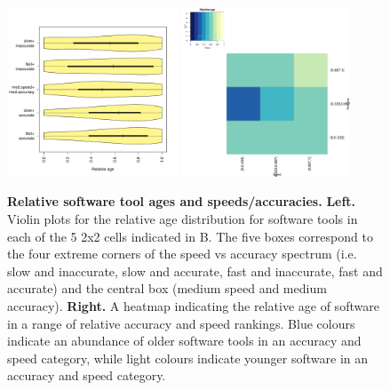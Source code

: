 \documentclass[fleqn,10pt]{SelfArx} %
\begin{document}
\begin{figure}[H]
\centering
\includegraphics[width=0.45\textwidth]{relAge-speedAcc.pdf}
\includegraphics[width=0.45\textwidth]{relAge-SpeedVsAccuracy-heatmap.pdf}
\caption{{\bf Relative software tool ages and speeds/accuracies.} {\bf Left.} Violin plots for the relative age distribution
  for software tools in each of the 5 2x2 cells indicated in B. The
  five boxes correspond to the four extreme corners of the speed vs
  accuracy spectrum (i.e. slow and inaccurate, slow and accurate, fast
  and inaccurate, fast and accurate) and the central box (medium speed
  and medium accuracy). {\bf Right.} A heatmap indicating the relative age
  of software in a range of relative accuracy and speed rankings. Blue
  colours indicate an abundance of older software tools in an accuracy
  and speed category, while light colours indicate younger software in
  an accuracy and speed category. }
\label{fig:ageplot}
\end{figure}
\end{document}
